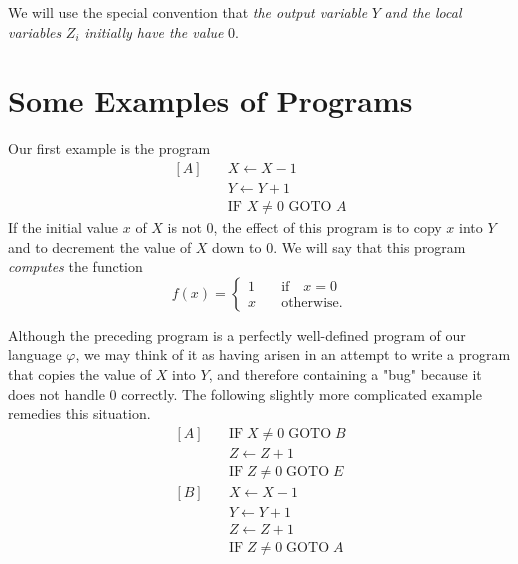 \documentclass[a4paper,10pt,twoside]{book}
\begin{document}
We will use the special convention that \textit{the output variable} $Y$ \textit{and the local variables} $Z_i$ \textit{initially have the value} 0.

\section{Some Examples of Programs}

Our first example is the program
\begin{equation*}
    \begin{array}{ll}[A]&\quad X\leftarrow X-1\\ &\quad Y\leftarrow Y+1\\ &\quad\text{IF }X\neq0\text{ GOTO }A\end{array}
\end{equation*}
If the initial value $x$ of $X$ is not 0,  the effect of this program is to copy $x$ into $Y$ and to decrement the value of $X$ down to 0. We will say that this program \textit{computes} the function $$f(x)=\left\{\begin{matrix}1&\quad\text{if}\quad x=0\\x&\quad\text{otherwise.}\end{matrix}\right.$$

Although the preceding program is a perfectly well-defined program of our language $\varphi$,  we may think of it as having arisen in an attempt to write a program that copies the value of $X$ into $Y$, and therefore containing a "bug" because it does not handle 0 correctly. The following slightly more complicated example remedies this situation.
\begin{equation*}
    \begin{aligned}[A]\quad&\mathrm{IF}\;X\neq0\;\mathrm{GOTO}\;B\\&Z\leftarrow Z+1\\&\mathrm{IF}\;Z\neq0\;\mathrm{GOTO}\;E\\ [B]\quad&X\leftarrow X-1\\&Y\leftarrow Y+1\\&Z\leftarrow Z+1\\&\mathrm{IF}\;Z\neq0\;\mathrm{GOTO}\;A\end{aligned}
\end{equation*}
\end{document}
